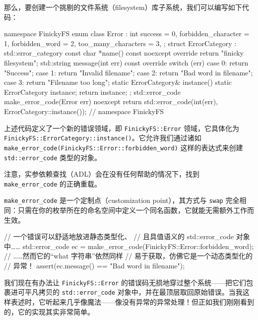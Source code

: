 那么，要创建一个挑剔的文件系统（filesystem）库子系统，我们可以编写如下代码：

\begin{codebox}[cpp]
     namespace FinickyFS {
     enum class Error : int {
       success = 0,
       forbidden_character = 1,
       forbidden_word = 2,
       too_many_characters = 3,
     };
     struct ErrorCategory : std::error_category
     {
       const char *name() const noexcept override {
         return "finicky filesystem";
       }
       std::string message(int err) const override {
         switch (err) {
           case 0: return "Success";
           case 1: return "Invalid filename";
           case 2: return "Bad word in filename";
           case 3: return "Filename too long";
         }
       }
       static ErrorCategory& instance() {
         static ErrorCategory instance;
         return instance;
       }
     };
     std::error_code make_error_code(Error err) noexcept
    {
       return std::error_code(int(err), ErrorCategory::instance());
     }
     } // namespace FinickyFS
\end{codebox}

上述代码定义了一个新的错误领域，即 \texttt{Finicky\allowbreak{}FS::\allowbreak{}Error} 领域，它具体化为 \texttt{Finicky\allowbreak{}FS::\allowbreak{}Error\allowbreak{}Category::\allowbreak{}instance(\allowbreak{})\allowbreak{}}。它允许我们通过诸如 \texttt{make\_\allowbreak{}error\_\allowbreak{}code(\allowbreak{}Finicky\allowbreak{}FS::\allowbreak{}Error::\allowbreak{}forbidden\_\allowbreak{}word)\allowbreak{}} 这样的表达式来创建 \texttt{std::\allowbreak{}error\_\allowbreak{}code} 类型的对象。

注意，实参依赖查找（ADL）会在没有任何帮助的情况下，找到 \texttt{make\_\allowbreak{}error\_\allowbreak{}code} 的正确重载。

\texttt{make\_\allowbreak{}error\_\allowbreak{}code} 是一个定制点（customization point），其方式与 \texttt{swap} 完全相同：只需在你的枚举所在的命名空间中定义一个同名函数，它就能无需额外工作而生效。

\begin{codebox}[cpp]
     // 一个错误可以舒适地放进静态类型化、
     // 且具值语义的 std::error_code 对象中……
     std::error_code ec =
       make_error_code(FinickyFS::Error::forbidden_word);
     // ……然而它的“what 字符串”依然同样
     // 易于获取，仿佛它是一个动态类型化的
     // 异常！
     assert(ec.message() == "Bad word in filename");
\end{codebox}

我们现在有办法让 \texttt{Finicky\allowbreak{}FS::\allowbreak{}Error} 的错误码无损地穿过整个系统——把它们包裹进可平凡拷贝的 \texttt{std::\allowbreak{}error\_\allowbreak{}code} 对象中，并在最顶层取回原始错误。当我这样表述时，它听起来几乎像魔法——像没有异常的异常处理！但正如我们刚刚看到的，它的实现其实非常简单。


